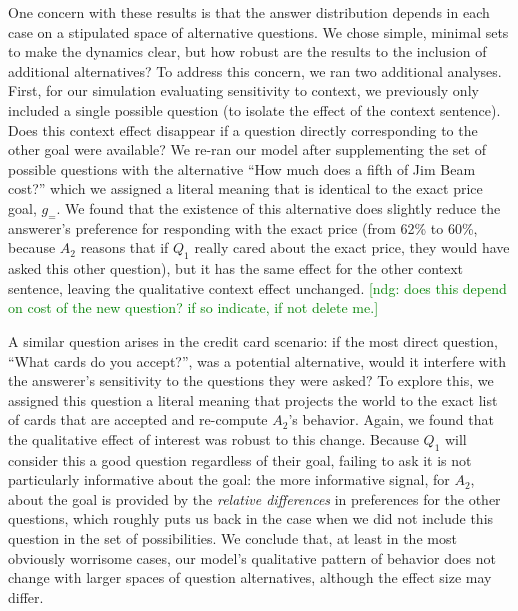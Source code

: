 \documentclass[11pt, floatsintext]{apa6}
\newcommand{\ndg}[1]{\textcolor{Green}{[ndg: #1]}}
\begin{document}

One concern with these results is that the answer distribution depends in each case on a stipulated space of alternative questions.
We chose simple, minimal sets to make the dynamics clear, but how robust are the results to the inclusion of additional alternatives?
To address this concern, we ran two additional analyses.
First, for our simulation evaluating sensitivity to context, we previously only included a single possible question (to isolate the effect of the context sentence).
Does this context effect disappear if a question directly corresponding to the other goal were available?
We re-ran our model after supplementing the set of possible questions with the alternative ``How much does a fifth of Jim Beam cost?'' which we assigned a literal meaning that is identical to the exact price goal, $g_{=}$.
We found that the existence of this alternative does slightly reduce the answerer's preference for responding with the exact price (from 62\% to 60\%, because $A_2$ reasons that if $Q_1$ really cared about the exact price, they would have asked this other question), but it has the same effect for the other context sentence, leaving the qualitative context effect unchanged.
\ndg{does this depend on cost of the new question? if so indicate, if not delete me.}

A similar question arises in the credit card scenario: if the most direct question, ``What cards do you accept?'', was a potential alternative, would it interfere with the answerer's sensitivity to the questions they were asked?
To explore this, we assigned this question a literal meaning that projects the world to the exact list of cards that are accepted and re-compute $A_2$'s behavior.
Again, we found that the qualitative effect of interest was robust to this change. 
Because $Q_1$ will consider this a good question regardless of their goal, failing to ask it is not particularly informative about the goal: the more informative signal, for $A_2$, about the goal is provided by the \emph{relative differences} in preferences for the other questions, which roughly puts us back in the case when we did not include this question in the set of possibilities.
We conclude that, at least in the most obviously worrisome cases, our model's qualitative pattern of behavior does not change with larger spaces of question alternatives, although the effect size may differ.
\end{document}
